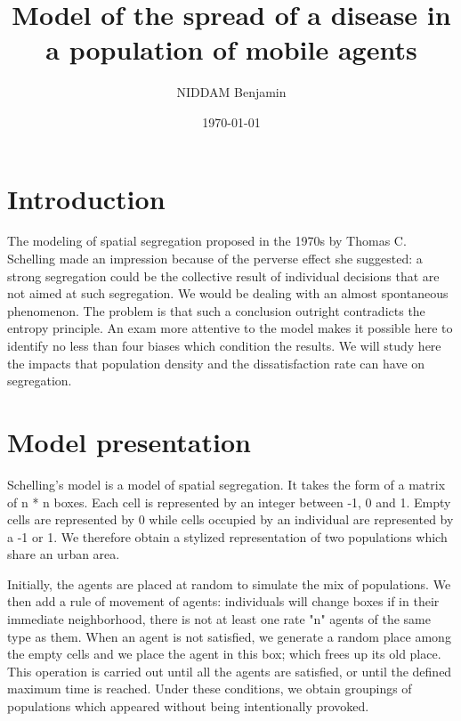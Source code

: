 \documentclass[a4paper, 12pt]{report}
\title{Model of the spread of a disease in a population of mobile agents}
\author{NIDDAM Benjamin}
\date{\today}
\begin{document}
\begin{titlepage}
	\maketitle
\end{titlepage}

\newpage

\tableofcontents

\newpage
\section{Introduction}
The modeling of spatial segregation proposed in the 1970s by Thomas
C. Schelling made an impression because of the perverse effect she suggested: a strong
segregation could be the collective result of individual decisions that are not aimed at
such segregation. We would be dealing with an almost spontaneous phenomenon. The problem is
that such a conclusion outright contradicts the entropy principle. An exam
more attentive to the model makes it possible here to identify no less than four biases which condition the
results. We will study here the impacts that population density and the dissatisfaction rate can have on segregation.

\section{Model presentation}

Schelling's model is a model of spatial segregation. It takes the form of a matrix of n * n boxes.
Each cell is represented by an integer between -1, 0 and 1. Empty cells are represented by 0 while cells
occupied by an individual are represented by a -1 or 1. We therefore obtain a stylized representation of two populations which
share an urban area.

Initially, the agents are placed at random to simulate the mix of populations. We then add a rule of
movement of agents: individuals will change boxes if in their immediate neighborhood, there is not at least one rate "n"
agents of the same type as them. When an agent is not satisfied, we generate a random place among the empty cells and we
place the agent in this box; which frees up its old place. This operation is carried out until all the agents
are satisfied, or until the defined maximum time is reached. Under these conditions, we obtain groupings of
populations which appeared without being intentionally provoked.

\newpage
\end{document}
